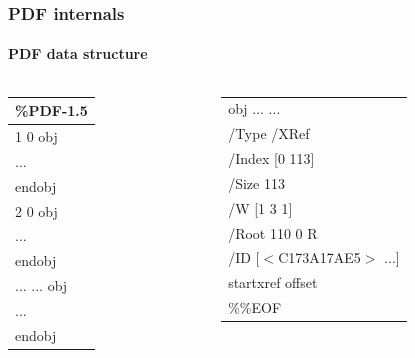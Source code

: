 \begin{frame}
    \frametitle{PDF internals}
    \framesubtitle{PDF data structure}
    \begin{columns}
        \begin{column}{0.15\textwidth}
                \begin{tabular}{|l|}
                    \hline
                    \%PDF-1.5\\
                     \hline
                    1 0 obj\\
                ...\\
                endobj\\
                \hline
                2 0 obj\\
                ...\\
                endobj\\
                \hline
                ... ... obj\\
                ...\\
                endobj\\
            \end{tabular}
        \end{column}
        \begin{column}{0.5\textwidth}
            \begin{tabular}{|l|}
                obj  ... ... \\
                /Type /XRef\\
                /Index [0 113]\\
                /Size 113\\
                /W [1 3 1]\\
                /Root 110 0 R\\
                /ID [$<$C173A17AE5$>$ ...]\\
                \hline
                startxref offset\\
                \hline
                \%\%EOF\\
                \hline
            \end{tabular}
        \end{column}
    \end{columns}
\end{frame}

